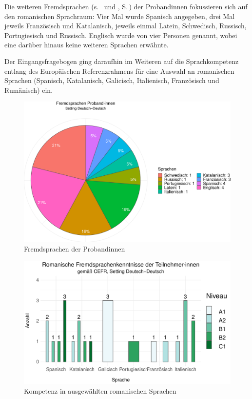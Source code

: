 Die weiteren Fremdsprachen (s.\  und , S.\,\pageref{K6:fig:CEFR-Niveau-DD}) der Proband{\textperiodcentered}innen fokussieren sich auf den romanischen Sprachraum: Vier Mal wurde Spanisch angegeben, drei Mal jeweils Französisch und Katalanisch, jeweils einmal Latein, Schwedisch, Russisch, Portugiesisch und Russisch. Englisch wurde von vier Personen genannt, wobei eine darüber hinaus keine weiteren Sprachen erwähnte.

Der Eingangsfragebogen ging daraufhin im Weiteren auf die Sprachkompetenz entlang des Europäischen Referenzrahmens für eine Auswahl an romanischen Sprachen (Spanisch, Katalanisch, Galicisch, Italienisch, Französisch und Rumänisch) ein.



\begin{figure}
    \includegraphics[width=\textwidth]{Figures/EingangsFB/ggplot_sprachen_DeDe_probanden}
	\caption{Fremdsprachen der Proband{\textperiodcentered}innen}
    \label{K6:fig:Fremdspr-Prob-DD}
\end{figure}



\begin{figure}
    \includegraphics[width=.85\textwidth]{Figures/EingangsFB/ggplot_Fremdsprachen-CEFR-DeDe}
	\caption{Kompetenz in ausgewählten romanischen Sprachen}
    \label{K6:fig:CEFR-Niveau-DD}
\end{figure}

